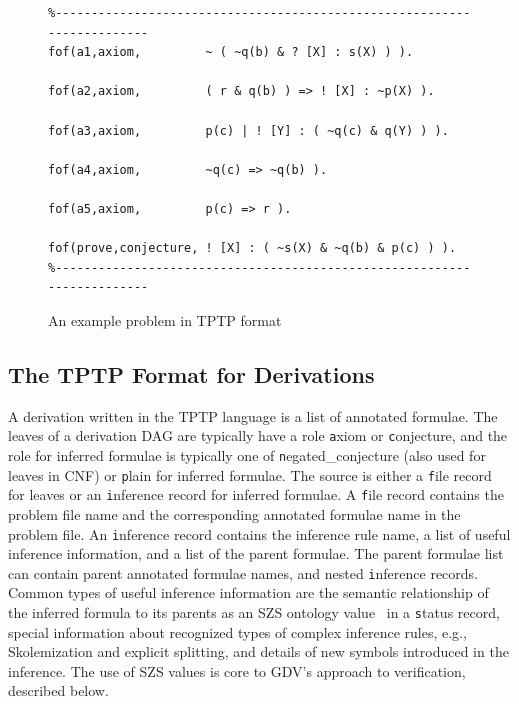 \documentclass[runningheads]{llncs}
\newcommand{\smalltt}[1]{\small \texttt{#1}}
\begin{document}
\begin{figure}[htb]
\centering
{\footnotesize
{\setlength{\baselineskip}{3mm}
\begin{verbatim}
%------------------------------------------------------------------------
fof(a1,axiom,         ~ ( ~q(b) & ? [X] : s(X) ) ).

fof(a2,axiom,         ( r & q(b) ) => ! [X] : ~p(X) ).

fof(a3,axiom,         p(c) | ! [Y] : ( ~q(c) & q(Y) ) ).

fof(a4,axiom,         ~q(c) => ~q(b) ).

fof(a5,axiom,         p(c) => r ).

fof(prove,conjecture, ! [X] : ( ~s(X) & ~q(b) & p(c) ) ).
%------------------------------------------------------------------------
\end{verbatim}
}}
\caption{An example problem in TPTP format}
\label{ExampleProblem}
\end{figure}

\subsection{The TPTP Format for Derivations}
\label{Derivations}

A derivation written in the TPTP language is a list of annotated formulae. 
The leaves of a derivation DAG are typically have a role {\smalltt axiom} or {\smalltt conjecture}, 
and the role for inferred formulae is typically one of {\smalltt negated\_conjecture} (also used 
for leaves in CNF) or {\smalltt plain} for inferred formulae. 
The source is either a {\smalltt file} record for leaves or an {\smalltt inference} record for 
inferred formulae.
A {\smalltt file} record contains the problem file name and the corresponding annotated formulae 
name in the problem file.
An {\smalltt inference} record contains the inference rule name, a list of useful inference 
information, and a list of the parent formulae.
The parent formulae list can contain parent annotated formulae names, and nested 
{\smalltt inference} records.
Common types of useful inference information are the semantic relationship of the inferred formula 
to its parents as an SZS ontology value~\cite{Sut08-KEAPPA} in a {\smalltt status} record, 
special information about recognized types of complex inference rules, e.g., Skolemization and
explicit splitting, and details of new symbols introduced in the inference.
The use of SZS values is core to GDV's approach to verification, described below.
\end{document}
